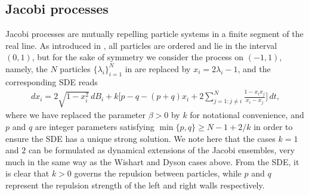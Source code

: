\documentclass{article}
\numberwithin{equation}{section}
\theoremstyle{plain}
\begin{document}
    \subsection{Jacobi processes}
    Jacobi processes are mutually repelling particle systems in a finite segment of the real line. As introduced in \cite{Demni10}, all particles are ordered and lie in the interval $(0,1)$, but for the sake of symmetry we consider the process on $(-1,1)$, namely, the $N$ particles $\{\lambda_i\}_{i=1}^N$ in \cite{Demni10} are replaced by $x_i=2\lambda_i-1$, and the corresponding SDE reads
    \begin{align*}
        dx_i=2\sqrt{1-x_i^2}\,dB_i+k\bigg[p-q-(p+q)x_i+2\sum_{j=1:j\neq i}^N\frac{1-x_ix_j}{x_i-x_j}\bigg]\,dt,
    \end{align*}
    where we have replaced the parameter $\beta>0$ by $k$ for notational convenience, and $p$ and $q$ are integer parameters satisfying $\min\{p,q\}\geq N-1+2/k$ in order to ensure the SDE has a unique strong solution.
    We note here that the cases $k=1$ and $2$ can be formulated as dynamical extensions of the Jacobi ensembles, very much in the same way as the Wishart and Dyson cases above.
    From the SDE, it is clear that $k>0$ governs the repulsion between particles, while $p$ and $q$ represent the repulsion strength of the left and right walls respectively.
\end{document}
